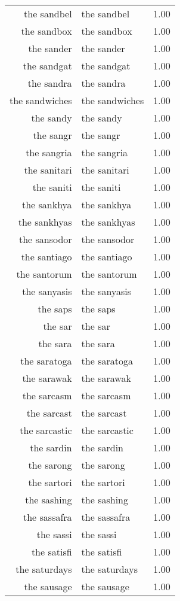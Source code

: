 \begin{table}[ht]
\begin{tabular}{rlr}
  the sandbel & the sandbel & 1.00 \\ 
  the sandbox & the sandbox & 1.00 \\ 
  the sander & the sander & 1.00 \\ 
  the sandgat & the sandgat & 1.00 \\ 
  the sandra & the sandra & 1.00 \\ 
  the sandwiches & the sandwiches & 1.00 \\ 
  the sandy & the sandy & 1.00 \\ 
  the sangr & the sangr & 1.00 \\ 
  the sangria & the sangria & 1.00 \\ 
  the sanitari & the sanitari & 1.00 \\ 
  the saniti & the saniti & 1.00 \\ 
  the sankhya & the sankhya & 1.00 \\ 
  the sankhyas & the sankhyas & 1.00 \\ 
  the sansodor & the sansodor & 1.00 \\ 
  the santiago & the santiago & 1.00 \\ 
  the santorum & the santorum & 1.00 \\ 
  the sanyasis & the sanyasis & 1.00 \\ 
  the saps & the saps & 1.00 \\ 
  the sar & the sar & 1.00 \\ 
  the sara & the sara & 1.00 \\ 
  the saratoga & the saratoga & 1.00 \\ 
  the sarawak & the sarawak & 1.00 \\ 
  the sarcasm & the sarcasm & 1.00 \\ 
  the sarcast & the sarcast & 1.00 \\ 
  the sarcastic & the sarcastic & 1.00 \\ 
  the sardin & the sardin & 1.00 \\ 
  the sarong & the sarong & 1.00 \\ 
  the sartori & the sartori & 1.00 \\ 
  the sashing & the sashing & 1.00 \\ 
  the sassafra & the sassafra & 1.00 \\ 
  the sassi & the sassi & 1.00 \\ 
  the satisfi & the satisfi & 1.00 \\ 
  the saturdays & the saturdays & 1.00 \\ 
  the sausage & the sausage & 1.00 \\ 

\end{tabular}
\end{table}
